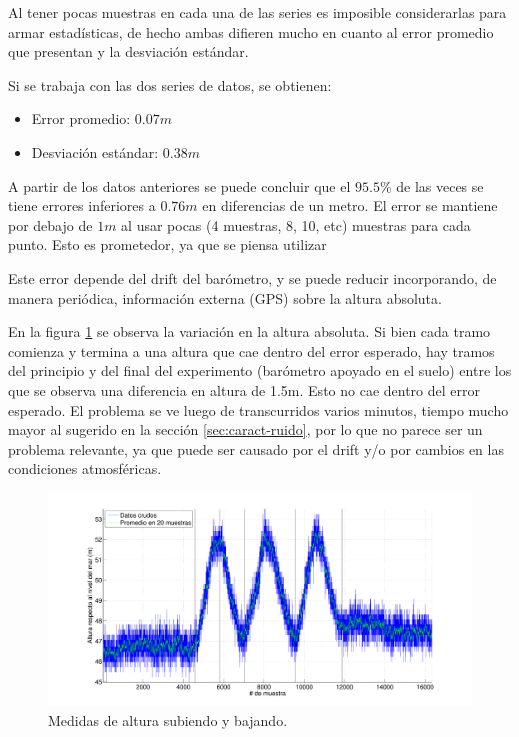\documentclass[spanish,12pt,a4paper,titlepage]{report}
\begin{document}
Al tener pocas muestras en cada una de las series es imposible considerarlas para armar estadísticas, de hecho ambas difieren mucho en cuanto al error promedio que presentan y la desviación estándar. 

Si se trabaja con las dos series de datos, se obtienen:

\begin{itemize}
\item Error promedio: $0.07m$
\item Desviación estándar: $0.38m$
\end{itemize}

A partir de los datos anteriores se puede concluir que el $95.5 \%$ de las veces se tiene errores inferiores a $0.76m$ en diferencias de un metro. El error se mantiene por debajo de $1m$ al usar pocas (4 muestras, 8, 10, etc) muestras para cada punto. Esto es prometedor, ya que se piensa utilizar 

Este error depende del drift del barómetro, y se puede reducir incorporando, de manera periódica, información externa (GPS) sobre la altura absoluta.

En la figura \ref{fig:variando} se observa la variación en la altura absoluta. Si bien cada tramo comienza y termina a una altura que cae dentro del error esperado, hay tramos del principio y del final del experimento (barómetro apoyado en el suelo) entre los que se observa una diferencia en altura de 1.5m. Esto no cae dentro del error esperado. El problema se ve luego de transcurridos varios minutos, tiempo mucho mayor al sugerido en la sección \ref{sec:caract-ruido}, por lo que no parece ser un problema relevante, ya que puede ser causado por el drift y/o por cambios en las condiciones atmosféricas.

\begin{figure}[H]
\hspace{-70pt}
  \includegraphics[width=1.3\textwidth]{./pics/variando.pdf}
  \caption{Medidas de altura subiendo y bajando.}
  \label{fig:variando}
\end{figure}
\end{document}
